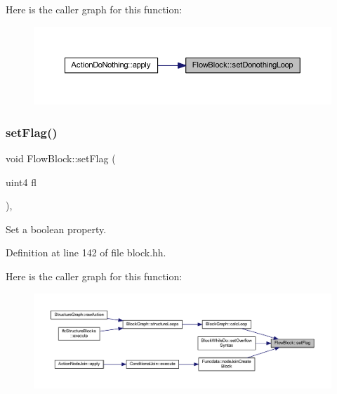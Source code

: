 Here is the caller graph for this function\+:
\nopagebreak
\begin{figure}[H]
\begin{center}
\leavevmode
\includegraphics[width=350pt]{class_flow_block_abab69fbbe915213e4164f2d2af788935_icgraph}
\end{center}
\end{figure}
\mbox{\label{class_flow_block_a99e1437634825bce66d6eb86d8b58e34}} 
\subsubsection{\texorpdfstring{setFlag()}{setFlag()}}
{\footnotesize\ttfamily void Flow\+Block\+::set\+Flag (\begin{DoxyParamCaption}\item[{uint4}]{fl }\end{DoxyParamCaption})\hspace{0.3cm}{\ttfamily [inline]}, {\ttfamily [protected]}}



Set a boolean property. 



Definition at line 142 of file block.\+hh.

Here is the caller graph for this function\+:
\nopagebreak
\begin{figure}[H]
\begin{center}
\leavevmode
\includegraphics[width=350pt]{class_flow_block_a99e1437634825bce66d6eb86d8b58e34_icgraph}
\end{center}
\end{figure}
\mbox{\label{class_flow_block_a50ac469ba63c50f574bf05f18a307f8c}} 
